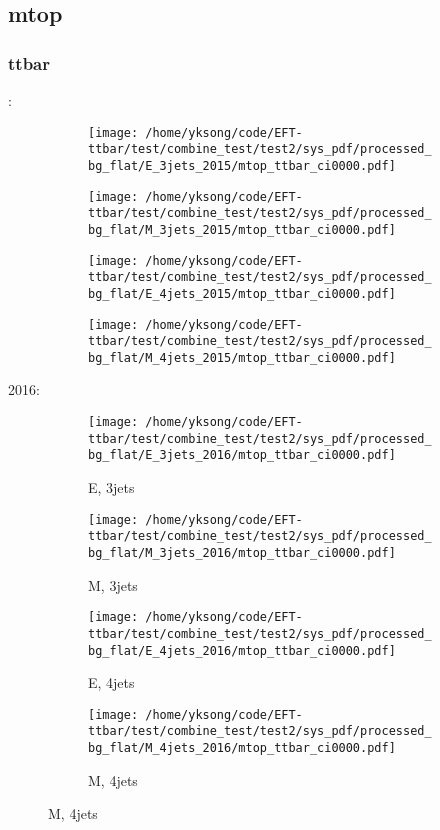 \documentclass{beamer}
\begin{document}
\subsection{mtop}

\begin{frame}
\frametitle{ttbar}
\fontsize{5}{1}:
\begin{figure}
\centering
\begin{subfigure}[b]{0.24\textwidth}
\texttt{[image: /home/yksong/code/EFT-ttbar/test/combine\_test/test2/sys\_pdf/processed\_bg\_flat/E\_3jets\_2015/mtop\_ttbar\_ci0000.pdf]}
\end{subfigure}
\begin{subfigure}[b]{0.24\textwidth}
\texttt{[image: /home/yksong/code/EFT-ttbar/test/combine\_test/test2/sys\_pdf/processed\_bg\_flat/M\_3jets\_2015/mtop\_ttbar\_ci0000.pdf]}
\end{subfigure}
\begin{subfigure}[b]{0.24\textwidth}
\texttt{[image: /home/yksong/code/EFT-ttbar/test/combine\_test/test2/sys\_pdf/processed\_bg\_flat/E\_4jets\_2015/mtop\_ttbar\_ci0000.pdf]}
\end{subfigure}
\begin{subfigure}[b]{0.24\textwidth}
\texttt{[image: /home/yksong/code/EFT-ttbar/test/combine\_test/test2/sys\_pdf/processed\_bg\_flat/M\_4jets\_2015/mtop\_ttbar\_ci0000.pdf]}
\end{subfigure}
\end{figure}
2016:
\begin{figure}
\centering
\begin{subfigure}[b]{0.24\textwidth}
\texttt{[image: /home/yksong/code/EFT-ttbar/test/combine\_test/test2/sys\_pdf/processed\_bg\_flat/E\_3jets\_2016/mtop\_ttbar\_ci0000.pdf]}
\captionsetup{font=tiny}
\caption{E, 3jets}
\end{subfigure}
\begin{subfigure}[b]{0.24\textwidth}
\texttt{[image: /home/yksong/code/EFT-ttbar/test/combine\_test/test2/sys\_pdf/processed\_bg\_flat/M\_3jets\_2016/mtop\_ttbar\_ci0000.pdf]}
\captionsetup{font=tiny}
\caption{M, 3jets}
\end{subfigure}
\begin{subfigure}[b]{0.24\textwidth}
\texttt{[image: /home/yksong/code/EFT-ttbar/test/combine\_test/test2/sys\_pdf/processed\_bg\_flat/E\_4jets\_2016/mtop\_ttbar\_ci0000.pdf]}
\captionsetup{font=tiny}
\caption{E, 4jets}
\end{subfigure}
\begin{subfigure}[b]{0.24\textwidth}
\texttt{[image: /home/yksong/code/EFT-ttbar/test/combine\_test/test2/sys\_pdf/processed\_bg\_flat/M\_4jets\_2016/mtop\_ttbar\_ci0000.pdf]}
\captionsetup{font=tiny}
\caption{M, 4jets}
\end{subfigure}
\end{figure}
\end{frame}
\end{document}
